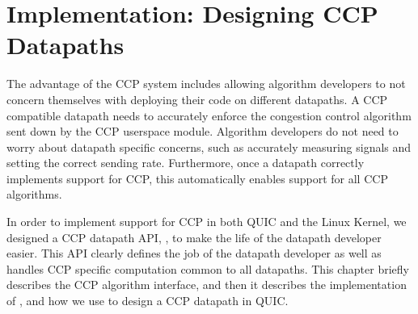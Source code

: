 \chapter{Implementation: Designing CCP Datapaths}
The advantage of the CCP system includes allowing algorithm developers to not concern themselves with deploying their code on different datapaths.
A CCP compatible datapath needs to accurately enforce the congestion control algorithm sent down by the CCP userspace module. Algorithm developers do not need to worry about datapath specific concerns, such as accurately measuring signals and setting the correct sending rate. Furthermore, once a datapath correctly implements support for CCP, this automatically enables support for all CCP algorithms.

In order to implement support for CCP in both QUIC and the Linux Kernel, we designed a CCP datapath API, \libccp, to make the life of the datapath developer easier. This API clearly defines the job of the datapath developer as well as handles CCP specific computation common to all datapaths. This chapter briefly describes the CCP algorithm interface, and then it describes the implementation of \libccp, and how we use \libccp to design a CCP datapath in QUIC.

